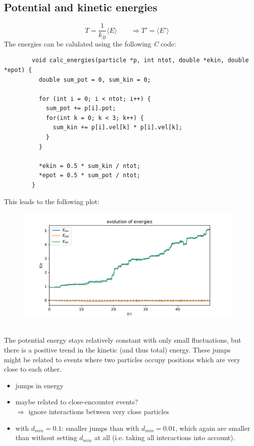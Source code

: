 \subsection{Potential and kinetic energies}
    \begin{equation}
    	T=\frac{1}{k_B}\langle E\rangle \qquad
        \Rightarrow T'=\langle E'\rangle
    \end{equation}
    The energies can be calulated using the following \textit{C} code: \\
    \begin{lstlisting}
        void calc_energies(particle *p, int ntot, double *ekin, double *epot) {
          double sum_pot = 0, sum_kin = 0;
        
          for (int i = 0; i < ntot; i++) {
            sum_pot += p[i].pot;
            for(int k = 0; k < 3; k++) {
              sum_kin += p[i].vel[k] * p[i].vel[k];
            }
          }
        
          *ekin = 0.5 * sum_kin / ntot;
          *epot = 0.5 * sum_pot / ntot;
        }\end{lstlisting}
    This leads to the following plot:
    \begin{figure}[h!]
        \centering
        \includegraphics[width=\textwidth]{../figures/energy.pdf}
    \end{figure} \ \\ 
    The potential energy stays relatively constant with only small fluctuations,
    but there is a positive trend in the kinetic (and thus total) energy.
    These jumps might be related to events where two particles occupy 
    positions which are very close to each other.
    \begin{itemize}
        \item jumps in energy
        \item maybe related to close-encounter events? \\
            $\Rightarrow$ ignore interactions between very close particles
        \item with $d_{min}=0.1$: smaller jumps than with $d_{min}=0.01$,
            which again are smaller than without setting $d_{min}$ at all 
            (i.e. taking all interactions into account).
    \end{itemize}
    

